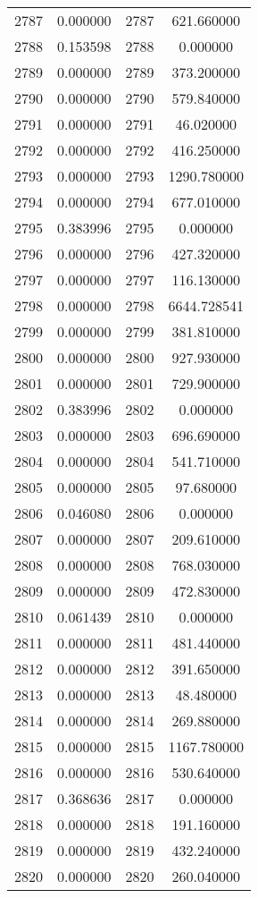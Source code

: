 \documentclass[12pt]{article}
\begin{document}
\begin{longtable}{@{}cccc@{}}
2787 & 0.000000 & 2787 & 621.660000 \\
2788 & 0.153598 & 2788 & 0.000000 \\
2789 & 0.000000 & 2789 & 373.200000 \\
2790 & 0.000000 & 2790 & 579.840000 \\
2791 & 0.000000 & 2791 & 46.020000 \\
2792 & 0.000000 & 2792 & 416.250000 \\
2793 & 0.000000 & 2793 & 1290.780000 \\
2794 & 0.000000 & 2794 & 677.010000 \\
2795 & 0.383996 & 2795 & 0.000000 \\
2796 & 0.000000 & 2796 & 427.320000 \\
2797 & 0.000000 & 2797 & 116.130000 \\
2798 & 0.000000 & 2798 & 6644.728541 \\
2799 & 0.000000 & 2799 & 381.810000 \\
2800 & 0.000000 & 2800 & 927.930000 \\
2801 & 0.000000 & 2801 & 729.900000 \\
2802 & 0.383996 & 2802 & 0.000000 \\
2803 & 0.000000 & 2803 & 696.690000 \\
2804 & 0.000000 & 2804 & 541.710000 \\
2805 & 0.000000 & 2805 & 97.680000 \\
2806 & 0.046080 & 2806 & 0.000000 \\
2807 & 0.000000 & 2807 & 209.610000 \\
2808 & 0.000000 & 2808 & 768.030000 \\
2809 & 0.000000 & 2809 & 472.830000 \\
2810 & 0.061439 & 2810 & 0.000000 \\
2811 & 0.000000 & 2811 & 481.440000 \\
2812 & 0.000000 & 2812 & 391.650000 \\
2813 & 0.000000 & 2813 & 48.480000 \\
2814 & 0.000000 & 2814 & 269.880000 \\
2815 & 0.000000 & 2815 & 1167.780000 \\
2816 & 0.000000 & 2816 & 530.640000 \\
2817 & 0.368636 & 2817 & 0.000000 \\
2818 & 0.000000 & 2818 & 191.160000 \\
2819 & 0.000000 & 2819 & 432.240000 \\
2820 & 0.000000 & 2820 & 260.040000 \\

\end{longtable}
\end{document}
